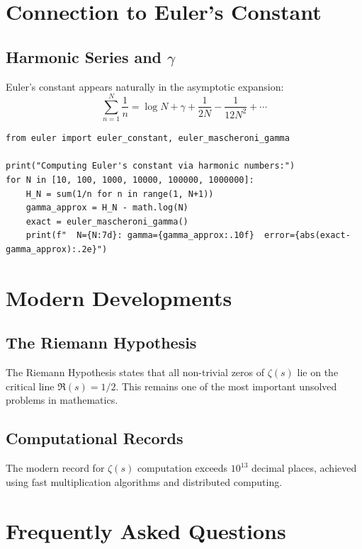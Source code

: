 \section{Connection to Euler's Constant}

\subsection{Harmonic Series and $\gamma$}

Euler's constant appears naturally in the asymptotic expansion:
\[
\sum_{n=1}^{N} \frac{1}{n} = \log N + \gamma + \frac{1}{2N} - \frac{1}{12N^2} + \cdots
\]

\begin{lstlisting}[caption={Computing $\gamma$ from harmonic numbers}, label=lst:euler_constant]
from euler import euler_constant, euler_mascheroni_gamma

print("Computing Euler's constant via harmonic numbers:")
for N in [10, 100, 1000, 10000, 100000, 1000000]:
    H_N = sum(1/n for n in range(1, N+1))
    gamma_approx = H_N - math.log(N)
    exact = euler_mascheroni_gamma()
    print(f"  N={N:7d}: gamma={gamma_approx:.10f}  error={abs(exact-gamma_approx):.2e}")
\end{lstlisting}

\section{Modern Developments}

\subsection{The Riemann Hypothesis}

The Riemann Hypothesis states that all non-trivial zeros of $\zeta(s)$ lie on the critical line
$\Re(s) = 1/2$. This remains one of the most important unsolved problems in mathematics.

\subsection{Computational Records}

The modern record for $\zeta(s)$ computation exceeds $10^{13}$ decimal places, achieved using
fast multiplication algorithms and distributed computing.

\section{Frequently Asked Questions}

